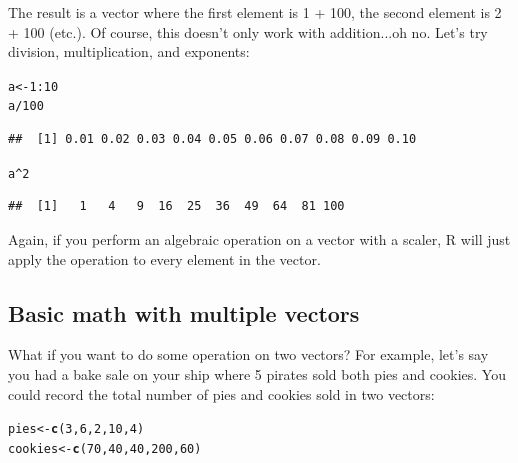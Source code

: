 \documentclass{tufte-book}\usepackage[]{graphicx}\usepackage[]{color}
\makeatletter
\newcommand{\hlnum}[1]{\textcolor[rgb]{0.686,0.059,0.569}{#1}}%
\newcommand{\hlopt}[1]{\textcolor[rgb]{0,0,0}{#1}}%
\newcommand{\hlstd}[1]{\textcolor[rgb]{0.345,0.345,0.345}{#1}}%
\newcommand{\hlkwb}[1]{\textcolor[rgb]{0.69,0.353,0.396}{#1}}%
\newcommand{\hlkwd}[1]{\textcolor[rgb]{0.737,0.353,0.396}{\textbf{#1}}}%
\newenvironment{kframe}{%
 \def\at@end@of@kframe{}%
 \ifinner\ifhmode%
  \def\at@end@of@kframe{\end{minipage}}%
  \begin{minipage}{\columnwidth}%
 \fi\fi%
 \def\FrameCommand##1{\hskip\@totalleftmargin \hskip-\fboxsep
 \colorbox{shadecolor}{##1}\hskip-\fboxsep
     \hskip-\linewidth \hskip-\@totalleftmargin \hskip\columnwidth}%
 \MakeFramed {\advance\hsize-\width
   \@totalleftmargin\z@ \linewidth\hsize
   \@setminipage}}%
 {\par\unskip\endMakeFramed%
 \at@end@of@kframe}
\newenvironment{knitrout}{}{} %
\makeatother
\begin{document}
The result is a vector where the first element is 1 + 100, the second element is 2 + 100 (etc.). Of course, this doesn't only work with addition...oh no. Let's try division, multiplication, and exponents:

\begin{knitrout}
\color{fgcolor}\begin{kframe}
\begin{alltt}
\hlstd{a} \hlkwb{<-} \hlnum{1}\hlopt{:}\hlnum{10}
\hlstd{a} \hlopt{/} \hlnum{100}
\end{alltt}
\begin{verbatim}
##  [1] 0.01 0.02 0.03 0.04 0.05 0.06 0.07 0.08 0.09 0.10
\end{verbatim}
\begin{alltt}
\hlstd{a} \hlopt{^} \hlnum{2}
\end{alltt}
\begin{verbatim}
##  [1]   1   4   9  16  25  36  49  64  81 100
\end{verbatim}
\end{kframe}
\end{knitrout}

Again, if you perform an algebraic operation on a vector with a scaler, R will just apply the operation to every element in the vector.

\subsection{Basic math with multiple vectors}

What if you want to do some operation on two vectors? For example, let's say you had a bake sale on your ship where 5 pirates sold both pies and cookies. You could record the total number of pies and cookies sold in two vectors:

\begin{knitrout}
\color{fgcolor}\begin{kframe}
\begin{alltt}
\hlstd{pies} \hlkwb{<-} \hlkwd{c}\hlstd{(}\hlnum{3}\hlstd{,} \hlnum{6}\hlstd{,} \hlnum{2}\hlstd{,} \hlnum{10}\hlstd{,} \hlnum{4}\hlstd{)}
\hlstd{cookies} \hlkwb{<-} \hlkwd{c}\hlstd{(}\hlnum{70}\hlstd{,} \hlnum{40}\hlstd{,} \hlnum{40}\hlstd{,} \hlnum{200}\hlstd{,} \hlnum{60}\hlstd{)}
\end{alltt}
\end{kframe}
\end{knitrout}
\end{document}
